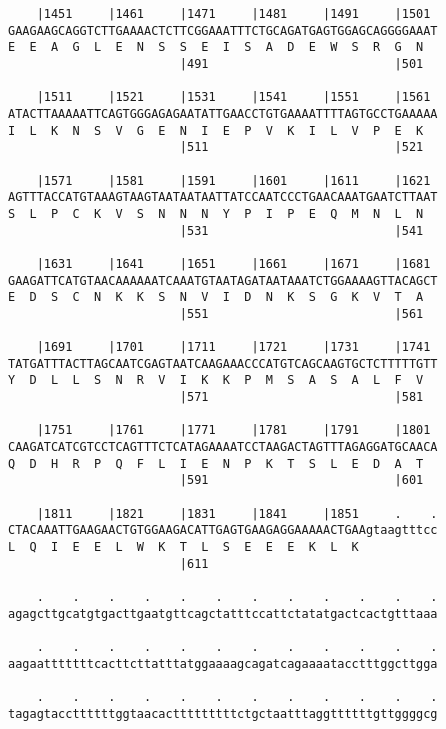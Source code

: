 \documentclass{article}
\begin{document}
\begin{Verbatim}
    |1451     |1461     |1471     |1481     |1491     |1501 
GAAGAAGCAGGTCTTGAAAACTCTTCGGAAATTTCTGCAGATGAGTGGAGCAGGGGAAAT
E  E  A  G  L  E  N  S  S  E  I  S  A  D  E  W  S  R  G  N  
                        |491                          |501  
  
    |1511     |1521     |1531     |1541     |1551     |1561 
ATACTTAAAAATTCAGTGGGAGAGAATATTGAACCTGTGAAAATTTTAGTGCCTGAAAAA
I  L  K  N  S  V  G  E  N  I  E  P  V  K  I  L  V  P  E  K  
                        |511                          |521  
  
    |1571     |1581     |1591     |1601     |1611     |1621 
AGTTTACCATGTAAAGTAAGTAATAATAATTATCCAATCCCTGAACAAATGAATCTTAAT
S  L  P  C  K  V  S  N  N  N  Y  P  I  P  E  Q  M  N  L  N  
                        |531                          |541  
  
    |1631     |1641     |1651     |1661     |1671     |1681 
GAAGATTCATGTAACAAAAAATCAAATGTAATAGATAATAAATCTGGAAAAGTTACAGCT
E  D  S  C  N  K  K  S  N  V  I  D  N  K  S  G  K  V  T  A  
                        |551                          |561  
  
    |1691     |1701     |1711     |1721     |1731     |1741 
TATGATTTACTTAGCAATCGAGTAATCAAGAAACCCATGTCAGCAAGTGCTCTTTTTGTT
Y  D  L  L  S  N  R  V  I  K  K  P  M  S  A  S  A  L  F  V  
                        |571                          |581  
  
    |1751     |1761     |1771     |1781     |1791     |1801 
CAAGATCATCGTCCTCAGTTTCTCATAGAAAATCCTAAGACTAGTTTAGAGGATGCAACA
Q  D  H  R  P  Q  F  L  I  E  N  P  K  T  S  L  E  D  A  T  
                        |591                          |601  
  
    |1811     |1821     |1831     |1841     |1851     .    .
CTACAAATTGAAGAACTGTGGAAGACATTGAGTGAAGAGGAAAAACTGAAgtaagtttcc
L  Q  I  E  E  L  W  K  T  L  S  E  E  E  K  L  K           
                        |611                                
  
    .    .    .    .    .    .    .    .    .    .    .    .
agagcttgcatgtgacttgaatgttcagctatttccattctatatgactcactgtttaaa
                                                            
    .    .    .    .    .    .    .    .    .    .    .    .
aagaatttttttcacttcttatttatggaaaagcagatcagaaaatacctttggcttgga
                                                            
    .    .    .    .    .    .    .    .    .    .    .    .
tagagtaccttttttggtaacactttttttttctgctaatttaggttttttgttggggcg
                                                            

\end{Verbatim}
\end{document}
